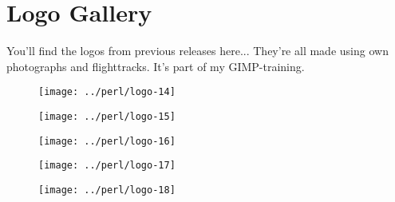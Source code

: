 \section{Logo Gallery}
You'll find the logos from previous releases here...
They're all made using own photographs and flighttracks. It's part of my GIMP-training.

\begin{figure}[h]
\begin{center}
\texttt{[image: ../perl/logo-14]}
\end{center}
\end{figure}

\begin{figure}[h]
\begin{center}
\texttt{[image: ../perl/logo-15]}
\end{center}
\end{figure}

\begin{figure}[h]
\begin{center}
\texttt{[image: ../perl/logo-16]}
\end{center}
\end{figure}

\begin{figure}[h]
\begin{center}
\texttt{[image: ../perl/logo-17]}
\end{center}
\end{figure}

\begin{figure}[h]
\begin{center}
\texttt{[image: ../perl/logo-18]}
\end{center}
\end{figure}



\clearpage